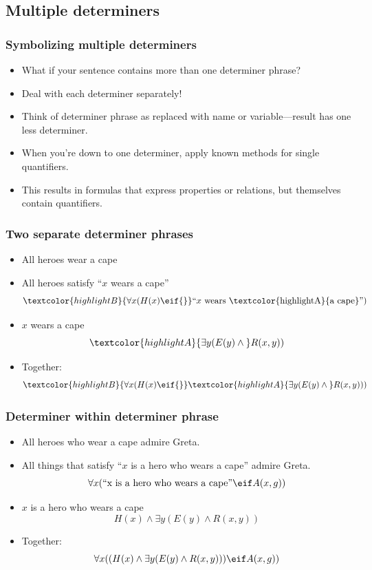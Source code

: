 \subsection{Multiple determiners}

\begin{frame}
  \frametitle{Symbolizing multiple determiners}

\begin{itemize}[<+->]
\item What if your sentence contains more than one determiner phrase?
\item Deal with each determiner separately!
\item Think of determiner phrase as replaced with name or variable---result has one less determiner.
\item When you're down to one determiner, apply known methods for single quantifiers.
\item This results in formulas that express properties or relations, but themselves contain quantifiers.
\end{itemize}
\end{frame}

\begin{frame}
    \frametitle{Two separate determiner phrases}

\begin{itemize}[<+->]
\item \textcolor{highlightB}{All heroes} wear \textcolor{highlightA}{a cape}
\item \textcolor{highlightB}{All heroes} satisfy ``$x$ wears \textcolor{highlightA}{a cape}'' \[
\textcolor{highlightB}{\forall x(H(x) \eif {}} \text{``$x$ wears \textcolor{highlightA}{a cape}''})
\]
\item $x$ wears \textcolor{highlightA}{a cape}\[
 \textcolor{highlightA}{\exists y(E(y) \land{}} R(x, y))
\]
\item Together:
\[
\textcolor{highlightB}{\forall x(H(x) \eif {}} \textcolor{highlightA}{\exists y(E(y) \land{}} R(x, y)))
\]
\end{itemize}
\end{frame}

\begin{frame}
    \frametitle{Determiner within determiner phrase}

\begin{itemize}[<+->]
\item \textcolor{highlightB}{All heroes who wear \textcolor{highlightA}{ a cape}} admire Greta.
\item All things that satisfy ``$x$ is a hero who wears \textcolor{highlightA}{a cape}'' admire Greta.
\[
\forall x (\text{``x is a hero who wears a cape''} \eif A(x,g))
\]
\item $x$ is a hero who wears \textcolor{highlightA}{a cape}
\[
 H(x) \land \exists y(E(y) \land R(x, y))
\]
\item Together:
\[
\forall x((H(x) \land \exists y(E(y) \land R(x, y))) \eif A(x,g))
\]
\end{itemize}
\end{frame}

